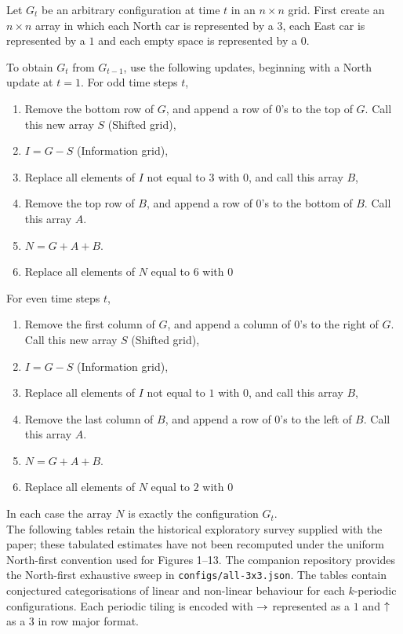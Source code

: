 \documentclass[../main.tex]{subfiles}
\begin{document}
Let $G_t$ be an arbitrary configuration at time $t$ in an $n \times n$ grid. First create an $n \times n$ array in which each North car is represented by a $3$, each East car is represented by a $1$ and each empty space is represented by a $0$.

To obtain $G_t$ from $G_{t-1}$, use the following updates, beginning with a North update at $t=1$. For odd time steps $t$,
\begin{enumerate}
    \item Remove the bottom row of $G$, and append a row of $0$'s to the top of $G$. Call this new array $S$ (Shifted grid),
    \item $I = G - S$ (Information grid),
    \item Replace all elements of $I$ not equal to $3$ with $0$, and call this array $B$,
    \item Remove the top row of $B$, and append a row of $0$'s to the bottom of $B$. Call this array $A$.
    \item $N = G + A + B$.
    \item Replace all elements of $N$ equal to $6$ with $0$
\end{enumerate}
For even time steps $t$,
\begin{enumerate}
    \item Remove the first column of $G$, and append a column of $0$'s to the right of $G$. Call this new array $S$ (Shifted grid),
    \item $I = G - S$ (Information grid),
    \item Replace all elements of $I$ not equal to $1$ with $0$, and call this array $B$,
    \item Remove the last column of $B$, and append a row of $0$'s to the left of $B$. Call this array $A$.
    \item $N = G + A + B$.
    \item Replace all elements of $N$ equal to $2$ with $0$
\end{enumerate}
In each case the array $N$ is exactly the configuration $G_t$. \\

The following tables retain the historical exploratory survey supplied with the paper; these tabulated estimates have not been recomputed under the uniform North-first convention used for Figures 1--13. The companion repository provides the North-first exhaustive sweep in \texttt{configs/all-3x3.json}. The tables contain conjectured categorisations of linear and non-linear behaviour for each $k$-periodic configurations. Each periodic tiling is encoded with $\mathord{\rightarrow}$ represented as a $1$ and $\mathord{\uparrow}$ as a $3$ in row major format.
\end{document}
